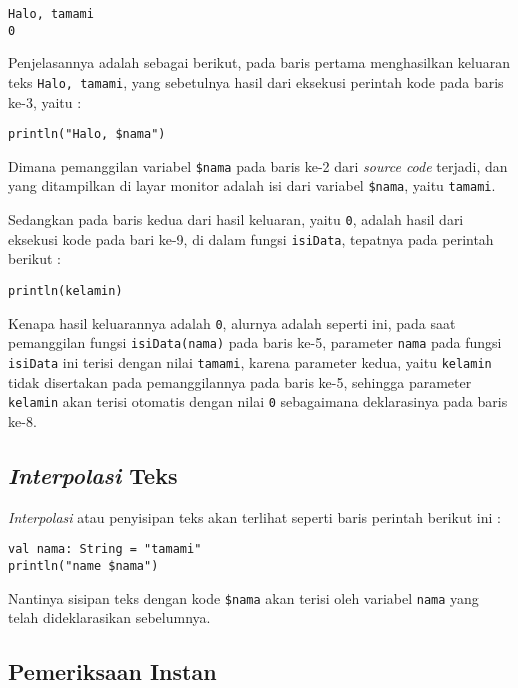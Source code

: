 \begin{lstlisting}
Halo, tamami
0
\end{lstlisting}

Penjelasannya adalah sebagai berikut, pada baris pertama menghasilkan keluaran teks \texttt{Halo, tamami}, yang sebetulnya hasil dari eksekusi perintah kode pada baris ke-3, yaitu :

\begin{lstlisting}
println("Halo, $nama")
\end{lstlisting}

Dimana pemanggilan variabel \texttt{\$nama} pada baris ke-2 dari \textit{source code} terjadi, dan yang ditampilkan di layar monitor adalah isi dari variabel \texttt{\$nama}, yaitu \texttt{tamami}.

Sedangkan pada baris kedua dari hasil keluaran, yaitu \texttt{0}, adalah hasil dari eksekusi kode pada bari ke-9, di dalam fungsi \texttt{isiData}, tepatnya pada perintah berikut :

\begin{lstlisting}
println(kelamin)
\end{lstlisting}

Kenapa hasil keluarannya adalah \texttt{0}, alurnya adalah seperti ini, pada saat pemanggilan fungsi \texttt{isiData(nama)} pada baris ke-5, parameter \texttt{nama} pada fungsi \texttt{isiData} ini terisi dengan nilai \texttt{tamami}, karena parameter kedua, yaitu \texttt{kelamin} tidak disertakan pada pemanggilannya pada baris ke-5, sehingga parameter \texttt{kelamin} akan terisi otomatis dengan nilai \texttt{0} sebagaimana deklarasinya pada baris ke-8.

\subsection{\textit{Interpolasi} Teks}

\textit{Interpolasi} atau penyisipan teks akan terlihat seperti baris perintah berikut ini :

\begin{lstlisting}
val nama: String = "tamami"
println("name $nama")
\end{lstlisting}

Nantinya sisipan teks dengan kode \texttt{\$nama} akan terisi oleh variabel \texttt{nama} yang telah dideklarasikan sebelumnya.

\subsection{Pemeriksaan Instan}



